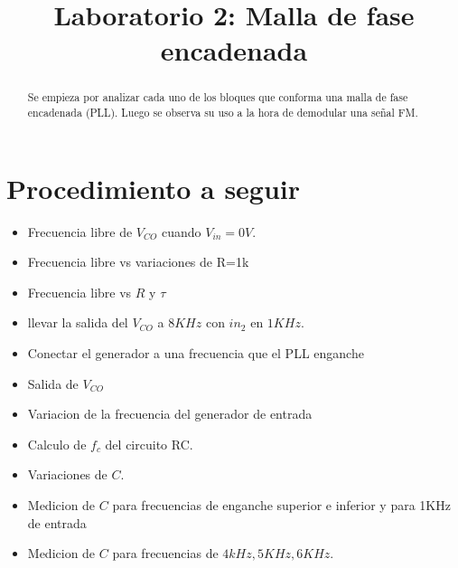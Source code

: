\documentclass[10pt,a4paper]{IEEEtran}
\begin{document}
\title{Laboratorio 2: Malla de fase encadenada}
\author{}

\maketitle

\begin{abstract}
    Se empieza por analizar cada uno de los bloques que conforma una malla de fase encadenada (PLL). Luego se observa su uso a la hora de demodular una señal FM. 
\end{abstract}
\section{Procedimiento a seguir}
\begin{itemize}
	\item Frecuencia libre de $V_{CO}$ cuando $V_{in}=0V$.
	\item Frecuencia libre vs variaciones de R=1k %
	\item Frecuencia libre vs $R$ y $\tau$
	\item llevar la salida del $V_{CO}$ a $8KHz$ con $in_2$ en $1KHz$.
	\item Conectar el generador a una frecuencia que el PLL enganche %
	\item Salida de $V_{CO}$
	\item Variacion de la frecuencia del generador de entrada
	\item Calculo de $f_c$ del circuito RC.
	\item Variaciones de $C$.
	\item Medicion de $C$ para frecuencias de enganche superior e inferior y para 1KHz de entrada 
	\item Medicion de $C$ para frecuencias de $4kHz, 5KHz, 6KHz$.
\end{itemize}
\end{document}
